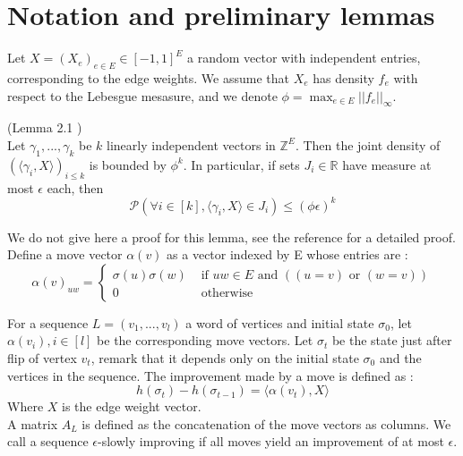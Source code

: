 \section{Notation and preliminary lemmas}

Let $X = (X_e)_{e \in E} \in [-1, 1]^E$ a random vector with independent entries, corresponding to the edge weights. We assume that $X_e$ has density $f_e$ with respect to the Lebesgue mesasure, and we denote $\phi = \max_{e \in E}||f_e||_\infty$. 

\begin{lemma} (Lemma 2.1 \cite{angel2016local})\\
\label{noise}
Let $\gamma_1, ..., \gamma_k$ be $k$ linearly independent vectors in $\mathbb{Z}^E$. Then the joint density of $(\langle \gamma_i, X \rangle)_{i \leq k}$ is bounded by $\phi^k$. In particular, if sets $J_i \in \mathbb R$ have measure at most $\epsilon$ each, then 
\begin{equation*}
\mathcal{P} (\forall i \in [k], \langle \gamma_i, X \rangle \in J_i) \leq (\phi \epsilon)^k
\end{equation*}
\end{lemma}

We do not give here a proof for this lemma, see the reference \cite{angel2016local} for a detailed proof.\\
Define a move vector $\alpha(v)$ as a vector indexed by E whose entries are :
\begin{equation*}
\alpha(v)_{uw} = 
\begin{cases}
\sigma(u)\sigma(w) &\text{ if } uw \in E \text{ and }( (u = v) \text{ or } (w = v)) \\
 0 &\text{ otherwise}
 \end{cases}
\end{equation*} 

For a sequence $L = (v_1, ..., v_l)$ a word of vertices and initial state $\sigma_0$, let $\alpha(v_i), i \in [l]$ be the corresponding move vectors. Let $\sigma_t$ be the state just after flip of vertex $v_t$, remark that it depends only on the initial state $\sigma_0$ and the vertices in the sequence.
The improvement made by a move is defined as :
\begin{equation*}
h(\sigma_t) - h(\sigma_{t-1}) = \langle \alpha(v_t), X \rangle
\end{equation*}
Where $X$ is the edge weight vector.\\ 
A matrix $A_L$ is defined as the concatenation of the move vectors as columns. We call a sequence $\epsilon$-slowly improving if all moves yield an improvement of at most $\epsilon$.

